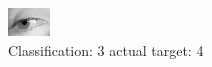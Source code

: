 \begin{figure}[h!]
\begin{center}
\includegraphics[width=0.60\columnwidth]{figures/ID2924_class_3_target_4.png}
\end{center}
\caption{ Classification: 3 actual target: 4}
\label{fig:ID2924_class_3_target_4}
\end{figure}
